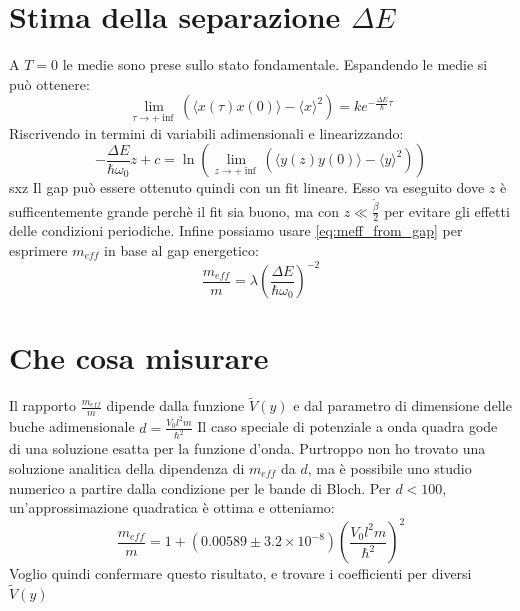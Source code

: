 \documentclass[italian]{article}
\begin{document}
\section{Stima della separazione $\Delta E$}

    A $T=0$ le medie sono prese sullo stato fondamentale. Espandendo le medie si può ottenere:
    $$
        \lim_{\tau\to+\inf} \left(\langle x\left(\tau\right)x\left(0\right)\rangle - \langle x \rangle^2\right) = k e^{-\frac{\Delta E}{\hbar} \tau}
    $$
    Riscrivendo in termini di variabili adimensionali e linearizzando:
    \begin{equation}
        -\frac{\Delta E}{\hbar \omega_0} z + c = \ln\left(\lim_{z\to+\inf} \left(\langle y\left(z\right)y\left(0\right)\rangle - \langle y \rangle^2\right)\right)
    \end{equation}sxz
    Il gap può essere ottenuto quindi con un fit lineare. Esso va eseguito dove $z$ è sufficentemente grande perchè il fit sia buono, ma con $z \ll \frac{\tilde{\beta}}{2}$ per evitare gli effetti delle condizioni periodiche.
    Infine possiamo usare \eqref{eq:meff_from_gap} per esprimere $m_{eff}$ in base al gap energetico:
    \begin{equation}
        \frac{m_{eff}}{m} = \lambda \left(\frac{\Delta E}{\hbar \omega_0}\right)^{-2}
    \end{equation}

\section{Che cosa misurare}
    
    Il rapporto $\frac{m_{eff}}{m}$ dipende dalla funzione $\tilde{V}(y)$ e dal parametro di dimensione delle buche adimensionale $d = \frac{V_0 l^2 m}{\hbar^2}$
    Il caso speciale di potenziale a onda quadra gode di una soluzione esatta per la funzione d'onda. Purtroppo non ho trovato una soluzione analitica della dipendenza di $m_{eff}$ da $d$, ma è possibile uno studio numerico a partire dalla condizione per le bande di Bloch.
    Per $d < 100$, un'approssimazione quadratica è ottima e otteniamo:
    \begin{equation}
        \frac{m_{eff}}{m} = 1 + \left(0.00589 \pm 3.2 \times 10^{-8}\right)\left(\frac{V_0 l^2 m}{\hbar^2}\right)^2
    \end{equation}
    Voglio quindi confermare questo risultato, e trovare i coefficienti per diversi $\tilde{V}(y)$
    
\end{document}
